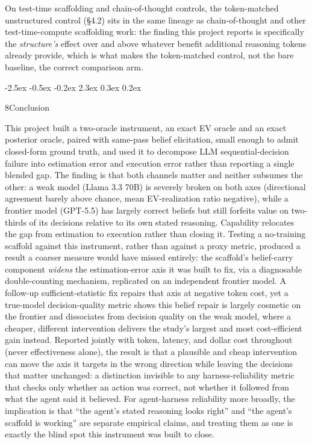 \documentclass[
  11pt,
]{article}
\makeatletter
\renewcommand{\section}{%
  \@startsection{section}{1}{\z@}%
                {-2.5ex \@plus -0.5ex \@minus -0.2ex}%
                { 2.3ex \@plus  0.3ex \@minus  0.2ex}%
                {\large\bf\raggedright}%
}
\makeatother
\begin{document}
On test-time scaffolding and chain-of-thought controls, the token-matched unstructured control (§4.2) sits in the same lineage as chain-of-thought and other test-time-compute scaffolding work: the finding this project reports is specifically the \emph{structure's} effect over and above whatever benefit additional reasoning tokens already provide, which is what makes the token-matched control, not the bare baseline, the correct comparison arm.

\section{8\quad Conclusion}\label{conclusion}

This project built a two-oracle instrument, an exact EV oracle and an exact posterior oracle, paired with same-pass belief elicitation, small enough to admit closed-form ground truth, and used it to decompose LLM sequential-decision failure into estimation error and execution error rather than reporting a single blended gap. The finding is that both channels matter and neither subsumes the other: a weak model (Llama 3.3 70B) is severely broken on both axes (directional agreement barely above chance, mean EV-realization ratio negative), while a frontier model (GPT-5.5) has largely correct beliefs but still forfeits value on two-thirds of its decisions relative to its own stated reasoning. Capability relocates the gap from estimation to execution rather than closing it. Testing a no-training scaffold against this instrument, rather than against a proxy metric, produced a result a coarser measure would have missed entirely: the scaffold's belief-carry component \emph{widens} the estimation-error axis it was built to fix, via a diagnosable double-counting mechanism, replicated on an independent frontier model. A follow-up sufficient-statistic fix repairs that axis at negative token cost, yet a true-model decision-quality metric shows this belief repair is largely cosmetic on the frontier and dissociates from decision quality on the weak model, where a cheaper, different intervention delivers the study's largest and most cost-efficient gain instead. Reported jointly with token, latency, and dollar cost throughout (never effectiveness alone), the result is that a plausible and cheap intervention can move the axis it targets in the wrong direction while leaving the decisions that matter unchanged: a distinction invisible to any harness-reliability metric that checks only whether an action was correct, not whether it followed from what the agent said it believed. For agent-harness reliability more broadly, the implication is that ``the agent's stated reasoning looks right'' and ``the agent's scaffold is working'' are separate empirical claims, and treating them as one is exactly the blind spot this instrument was built to close.
\end{document}
